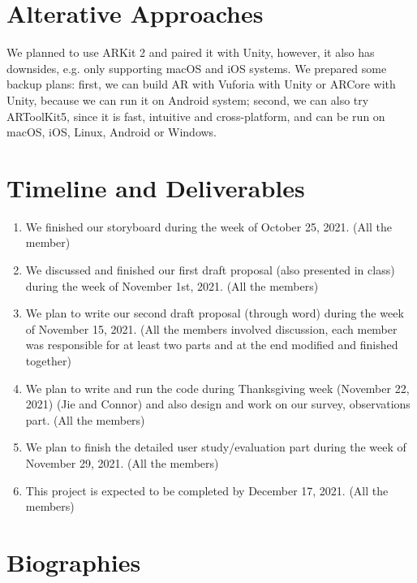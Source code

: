 \documentclass[manuscript, nonacm]{acmart}
\begin{document}
\section{Alterative Approaches}

We planned to use ARKit 2 and paired it with Unity, however, it also has
downsides, e.g. only supporting macOS and iOS systems. We prepared some backup
plans: first, we can build AR with Vuforia with Unity or ARCore with Unity,
because we can run it on Android system; second, we can also try ARToolKit5,
since it is fast, intuitive and cross-platform, and can be run on macOS, iOS,
Linux, Android or Windows.

\section{Timeline and Deliverables}

\begin{enumerate}
    \item We finished our storyboard during the week of October 25, 2021. (All the
    member)
    \item We discussed and finished our first draft proposal (also presented in
    class) during the week of November 1st, 2021. (All the members)
    \item We plan to write our second draft proposal (through word) during the week
    of November 15, 2021. (All the members involved discussion, each member was
    responsible for at least two parts and at the end modified and finished
    together)
    \item We plan to write and run the code during Thanksgiving week (November 22,
    2021) (Jie and Connor) and also design and work on our survey, observations
    part. (All the members)
    \item We plan to finish the detailed user study/evaluation part during the week
    of November 29, 2021. (All the members)
    \item This project is expected to be completed by December 17, 2021. (All the
    members)
\end{enumerate}

\section{Biographies}
\end{document}
